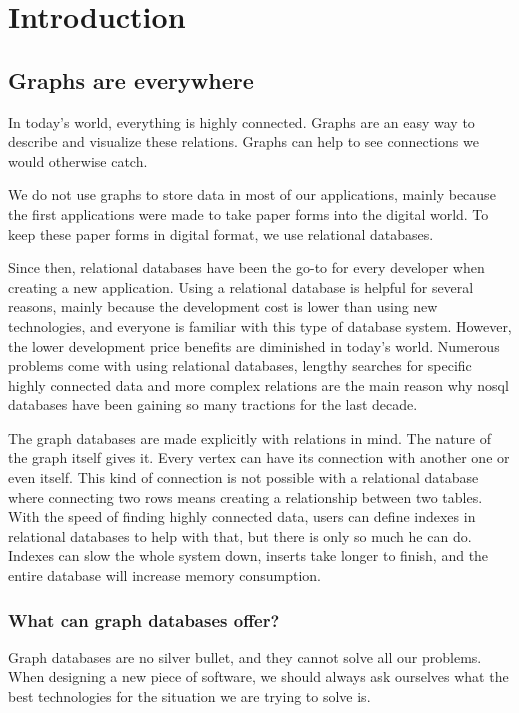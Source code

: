 \chapter{Introduction}

\section{Graphs are everywhere}

In today's world, everything is highly connected. Graphs are an easy way to describe and visualize these relations. Graphs can help to see connections we would otherwise catch.

We do not use graphs to store data in most of our applications, mainly because the first applications were made to take paper forms into the digital world. To keep these paper forms in digital format, we use relational databases.

Since then, relational databases have been the go-to for every developer when creating a new application. Using a relational database is helpful for several reasons, mainly because the development cost is lower than using new technologies, and everyone is familiar with this type of database system. However, the lower development price benefits are diminished in today's world. Numerous problems come with using relational databases,
lengthy searches for specific highly connected data and more complex relations are the main reason why \Gls{nosql} databases have been gaining so many tractions for the last decade.

The graph databases are made explicitly with relations in mind. The nature of the graph itself gives it. Every vertex can have its connection with another one or even itself. This kind of connection is not possible with a relational database where connecting two rows means creating a relationship between two tables. With the speed of finding highly connected data, users can define indexes in relational databases to help with that, but there is only so much he can do. Indexes can slow the whole system down, inserts take longer to finish, and the entire database will increase memory consumption.

\subsection{What can graph databases offer?}

Graph databases are no silver bullet, and they cannot solve all our problems. When designing a new piece of software, we should always ask ourselves what the best technologies for the situation we are trying to solve is.

